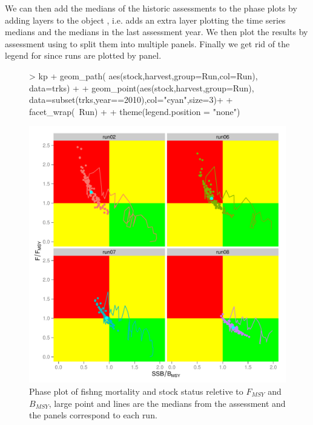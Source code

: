 \documentclass[shortnames,nojss,article]{jss}
\begin{document}
We can then add the medians of the historic assessments to the phase plots by adding layers to the  object
, i.e.  adds an extra layer plotting the time series medians and  the medians in the
last assessment year. We then plot the results by assessment using  to split them into multiple panels.
Finally we get rid of the legend for  since runs are plotted by panel.

\begin{figure}\begin{center}
\begin{Schunk}
\begin{Sinput}
> kp + geom_path( aes(stock,harvest,group=Run,col=Run), data=trks) +
+      geom_point(aes(stock,harvest,group=Run), data=subset(trks,year==2010),col="cyan",size=3)+
+      facet_wrap(~Run) + 
+      theme(legend.position = "none")
\end{Sinput}
\end{Schunk}
\includegraphics{kobe-018}
\caption{Phase plot of fishng mortality and stock status reletive to $F_{MSY}$ and  $B_{MSY}$, large point and lines are the medians
from the assessment and the panels correspond to  each run.}
\end{center}\end{figure}
\end{document}
